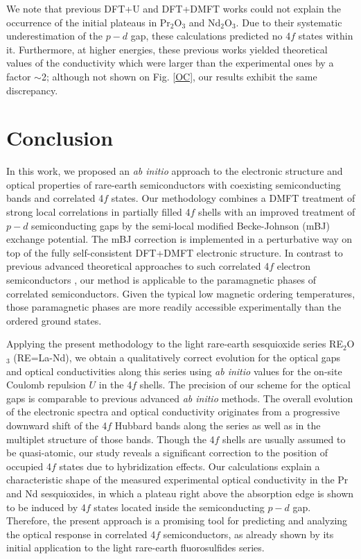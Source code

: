 \documentclass[aps,prb,twocolumn,amsmath,amssymb]{revtex4}
\begin{document}
 We note that previous DFT+U\cite{Singh2006} and DFT+DMFT\cite{Tomczak2007}  works could not explain the occurrence of the initial plateaus  in Pr$_2$O$_3$ and Nd$_2$O$_3$. Due to their systematic underestimation of the $p-d$ gap, these calculations predicted no 4$f$ states within it. Furthermore, at higher energies, these previous works yielded theoretical values of the conductivity which were larger than the experimental ones by a factor $\sim$2; although not shown on Fig. \ref{OC}, our results exhibit the same discrepancy.


\section{Conclusion}

In this work, we proposed an {\it ab initio} approach to the electronic structure and optical properties of rare-earth semiconductors with coexisting semiconducting bands and correlated 4$f$ states.  Our methodology  combines a DMFT treatment of  strong local correlations in partially filled 4$f$ shells with an improved treatment of $p-d$ semiconducting gaps by the semi-local modified Becke-Johnson (mBJ) exchange potential. The mBJ correction is implemented in a perturbative way on top of the fully self-consistent DFT+DMFT electronic structure. In contrast to previous advanced theoretical approaches to such correlated 4$f$ electron semiconductors \cite{Jiang2012,Gillen2013}, our method is applicable to the paramagnetic phases of correlated semiconductors. Given the typical low magnetic ordering temperatures, those paramagnetic phases are more readily accessible experimentally than
the ordered ground states.

 Applying the present methodology to the light rare-earth sesquioxide series RE$_2$O$_3$ (RE=La-Nd), we obtain a qualitatively correct evolution for the optical gaps and optical conductivities along this series using {\it ab initio} values for the on-site Coulomb repulsion $U$ in the 4$f$ shells.  The precision of our scheme for the optical gaps is comparable to previous advanced  {\it ab initio} methods\cite{Jiang2012,Gillen2013}. The overall evolution of the electronic spectra and optical conductivity originates from a progressive downward shift of the 4$f$ Hubbard bands along the series as well as in the multiplet structure of those bands. Though the 4$f$ shells are usually assumed to be quasi-atomic, our study reveals a significant correction to the position of occupied 4$f$ states due to hybridization effects. Our calculations explain a characteristic shape of the measured experimental optical conductivity in the Pr and Nd sesquioxides, in which a plateau right above the  absorption edge is shown to be induced by 4$f$ states located inside the semiconducting $p-d$ gap. Therefore, the present approach is a promising tool for predicting and analyzing the optical response in correlated 4$f$ semiconductors, as already shown by its initial application to the light rare-earth fluorosulfides series\cite{LnSF_paper}.\\
\end{document}
